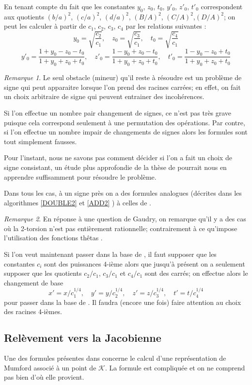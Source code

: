 \documentclass[a4paper,12pt]{article}
\theoremstyle{definition}
\theoremstyle{remark}
\newtheorem{remarque}{Remarque}
\numberwithin{equation}{section}
\begin{document}
En tenant compte du fait que les constantes $y_0$, $z_0$, $t_0$, $y'_0$, $z'_0$, $t'_0$ correspondent aux quotients $(b/a)^2$, $(c/a)^2$, $(d/a)^2$, $(B/A)^2$, $(C/A)^2$,$(D/A)^2$; on peut les calculer à partir de $c_1$, $c_2$, $c_3$, $c_4$ par les relations suivantes :
$$y_0 = \sqrt{\frac{c_2}{c_1}}, \quad z_0 = \sqrt{\frac{c_3}{c_1}}, \quad t_0 = \sqrt{\frac{c_4}{c_1}}$$
$$y'_0 = \frac{1+y_0-z_0-t_0}{1+y_0+z_0+t_0}, \quad z'_0 = \frac{1-y_0+z_0-t_0}{1+y_0+z_0+t_0}, \quad
t'_0 = \frac{1-y_0-z_0+t_0}{1+y_0+z_0+t_0}$$

\begin{remarque}
Le seul obstacle (mineur) qu'il reste à résoudre est un problème de signe qui peut apparaitre lorsque l'on prend des racines carrées; en effet, on fait un choix arbitraire de signe qui peuvent entrainer des incohérences.

Si l'on effectue un nombre pair changement de signes, ce n'est pas très grave puisque cela correspond seulement à une permutation des opérations. Par contre, si l'on effectue un nombre impair de changements de signes alors les formules sont tout simplement fausses.

Pour l'instant, nous ne savons pas comment décider si l'on a fait un choix de signe consistant, un étude plus approfondie de la thèse de \citet{cosset} pourrait nous en apprendre suffisamment pour résoudre le problème.
\end{remarque}

Dans tous les cas, à un signe près on a des formules analogues (décrites dans les algorithmes \ref{DOUBLE2} et \ref{ADD2} ) à celles de \citep{gaudry}.

\begin{remarque}
En réponse à une question de Gaudry, on remarque qu'il y a des cas où la 2-torsion n'est pas entièrement rationnelle; contrairement à ce qu'impose l'utilisation des fonctions thêtas \citep{gaudry}.
\end{remarque}

Si l'on veut maintenant passer dans la base de \citet{gaudry}, il faut supposer que les constantes $c_i$ sont des puissances 4-ième alors que jusqu'à présent on a seulement supposer que les quotients $c_2/c_1$, $c_3/c_1$ et $c_4/c_1$ sont des carrés; on effectue alors le changement de base
$$x'=x/c_1^{1/4}, \quad y'=y/c_2^{1/4}, \quad z'=z/c_3^{1/4}, \quad t'=t/c_4^{1/4}$$ pour passer dans la base de \citet{gaudry}. Il faudra (encore une fois) faire attention au choix des racines 4-ièmes.

\subsection{Relèvement vers la Jacobienne}
Une des formules présentes dans \citep{gaudry} concerne le calcul d'une représentation de Mumford associé à un point de $\mathcal{K}$. La formule est compliquée et on ne comprend pas bien d'où elle provient.
\end{document}
